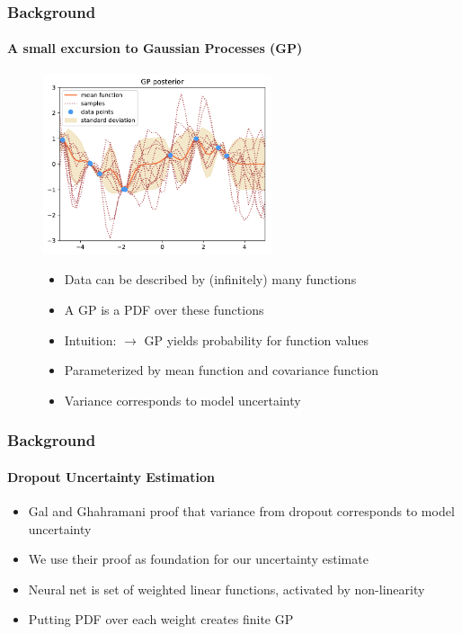 \documentclass[9pt]{beamer}
\begin{document}
\begin{frame}
\frametitle{Background}
\framesubtitle{A small excursion to Gaussian Processes (GP)}
\begin{figure}
	\centering
	\includegraphics[width=0.6\textwidth]{images/post.pdf}
	\begin{itemize}
		\item Data can be described by (infinitely) many functions
		\item A GP is a PDF over these functions
		\item Intuition: $\rightarrow$ GP yields probability for function values %
		\item Parameterized by mean function and covariance function
		\item Variance corresponds to model uncertainty
	\end{itemize}
\end{figure}
\end{frame}


\begin{frame}
\frametitle{Background}
\framesubtitle{Dropout Uncertainty Estimation}
	\begin{itemize}
	\item Gal and Ghahramani \cite{gal2016dropout} proof that variance from dropout corresponds to model uncertainty
	\item We use their proof as foundation for our uncertainty estimate
	\item Neural net is set of weighted linear functions, activated by non-linearity
	\item Putting PDF over each weight creates finite GP
\end{itemize}
\end{frame}
\end{document}
